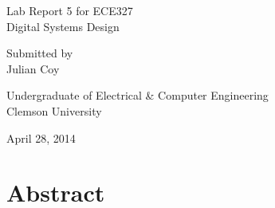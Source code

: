 \documentclass[11pt]{report}
\begin{document}
\begin{spacing}{1.5}

\thispagestyle{empty}

\begin{scshape}

\vspace*{30pt}
{
\Huge
\begin{center}
    \reporttitle
\end{center}
}
\vspace{30pt}

{
\Large
\begin{center}
  Lab Report 5 for ECE327 \\
  Digital Systems Design
\end{center}
}
\vspace{30pt}
{
\Large 
\begin{center}
  Submitted by \\
  Julian Coy
\end{center}
}
\vspace{120pt}

{
\Large
\begin{center}
  Undergraduate of Electrical \& Computer Engineering \\
  Clemson University
\end{center}
}
\vspace{30pt}

{
\Large
\begin{center}
  April 28, 2014
\end{center}
}

\end{scshape}

\clearpage


\vspace{15pt}
  \setcounter{chapter}{1}
  \chapter*{Abstract}
  \label{cha:abstract}
\vspace{72pt}


\end{spacing}
\end{document}
